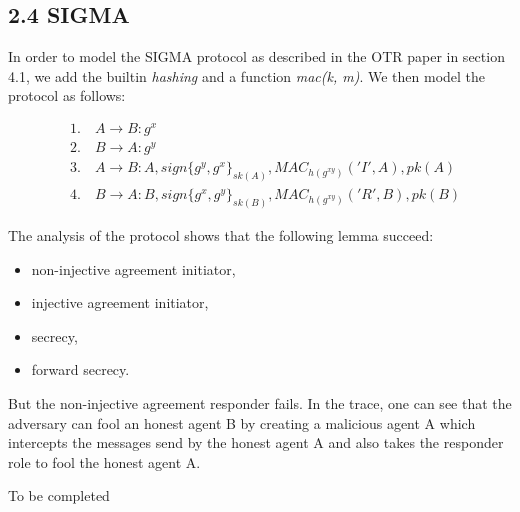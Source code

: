 \documentclass[
]{article}
\begin{document}
\newpage
\hypertarget{sigma}{%
\subsection{2.4 SIGMA}\label{sigma}}

In order to model the SIGMA protocol as described in the OTR paper in section 4.1, we add the builtin \emph{hashing} and a function \emph{mac(k, m)}. We then model the protocol as follows:

\begin{align*}
&\text{1.} \quad A \rightarrow B: g^x \\
&\text{2.} \quad B \rightarrow A: g^y \\
&\text{3.} \quad A \rightarrow B: A, sign\{g^y, g^x\}_{sk(A)}, MAC_{h(g^{xy})}('I', A), pk(A) \\
&\text{4.} \quad B \rightarrow A: B, sign\{g^x, g^y\}_{sk(B)}, MAC_{h(g^{xy})}('R', B), pk(B)
\end{align*}

The analysis of the protocol shows that the following lemma succeed:

\begin{itemize}
    \item non-injective agreement initiator,
    \item injective agreement initiator,
    \item secrecy,
    \item forward secrecy.
\end{itemize}

But the non-injective agreement responder fails. In the trace, one can see that the adversary can fool an honest agent B by creating a malicious agent A which intercepts the messages send by the honest agent A and also takes the responder role to fool the honest agent A.

To be completed
\end{document}
